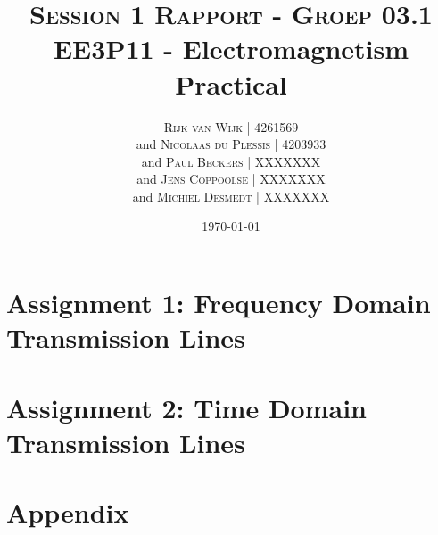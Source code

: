 \documentclass[11pt, a4paper, oneside]{article}
\title{\textsc{Session 1 Rapport - Groep 03.1}
	\newline \textbf{EE3P11 - Electromagnetism Practical}\\
}
\author{
	\textsc{Rijk van Wijk | 4261569}\\
	and
	\textsc{Nicolaas du Plessis | 4203933}\\
	and
	\textsc{Paul Beckers | XXXXXXX}\\
	and
	\textsc{Jens Coppoolse | XXXXXXX}\\
	and
	\textsc{Michiel Desmedt | XXXXXXX}\\
}
\date {\today}
\let\stdsection\section
\renewcommand\section{\newpage\stdsection}
\begin{document}
	\maketitle
	\thispagestyle{empty}
	\newpage
	
	\section*{Assignment 1: Frequency Domain Transmission Lines}
	
	\section*{Assignment 2: Time Domain Transmission Lines}
	

	\section*{Appendix}
	
\end{document}
